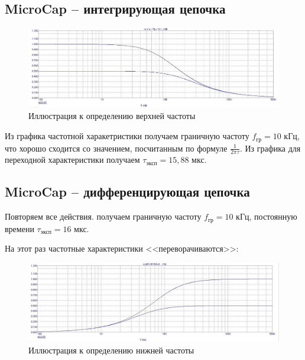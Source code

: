 \documentclass[a4paper, 12pt]{article}
\begin{document}
\subsection*{MicroCap -- интегрирующая цепочка}
\begin{figure}[H]
\centering
\includegraphics[width=1\textwidth]{rcintanal}
\caption{Иллюстрация к определению верхней частоты}
\end{figure}

Из графика частотной харакетристики получаем граничную частоту $f_\text{гр} = 10$ кГц, что хорошо сходится со значением, посчитанным по формуле $\frac{1}{2\pi \tau}$.
Из графика для переходной характеристики получаем $\tau_{\text{эксп}} = 15,88$ мкс.
\subsection*{MicroCap -- дифференцирующая цепочка}
Повторяем все действия. получаем граничную частоту $f_\text{гр} = 10$ кГц, постоянную времени $\tau_{\text{эксп}} = 16$ мкс.

На этот раз частотные характеристики <<переворачиваются>>:
\begin{figure}[H]
\centering
\includegraphics[width=1\textwidth]{rcdiffanal}
\caption{Иллюстрация к определению нижней частоты}
\end{figure}
\end{document}
